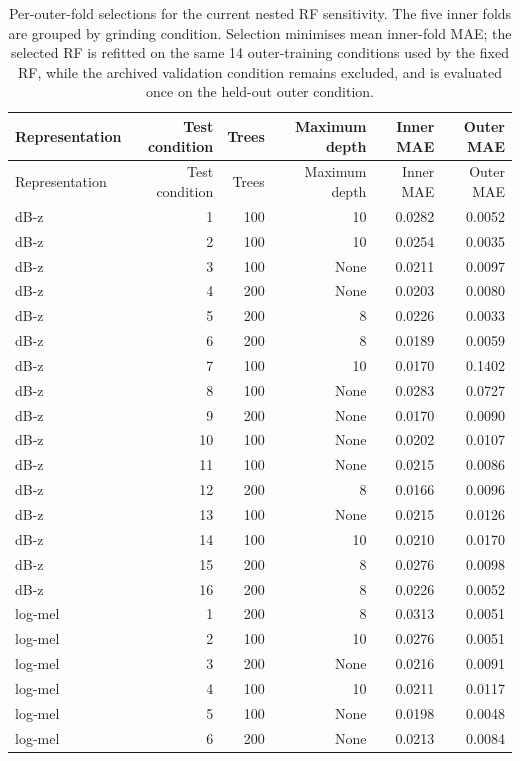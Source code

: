 \begin{longtable}{@{}lrrrrr@{}}
\caption{Per-outer-fold selections for the current nested RF sensitivity.
The five inner folds are grouped by grinding condition. Selection minimises
mean inner-fold MAE; the selected RF is refitted on the same 14 outer-training
conditions used by the fixed RF, while the archived validation condition
remains excluded, and is evaluated once on the held-out outer condition.}
\label{tab:supp-nested-rf-selections}\\
\toprule
Representation & Test condition & Trees & Maximum depth & Inner MAE & Outer MAE \\
\midrule
\endfirsthead
\toprule
Representation & Test condition & Trees & Maximum depth & Inner MAE & Outer MAE \\
\midrule
\endhead
dB-z & 1 & 100 & 10 & 0.0282 & 0.0052 \\
dB-z & 2 & 100 & 10 & 0.0254 & 0.0035 \\
dB-z & 3 & 100 & None & 0.0211 & 0.0097 \\
dB-z & 4 & 200 & None & 0.0203 & 0.0080 \\
dB-z & 5 & 200 & 8 & 0.0226 & 0.0033 \\
dB-z & 6 & 200 & 8 & 0.0189 & 0.0059 \\
dB-z & 7 & 100 & 10 & 0.0170 & 0.1402 \\
dB-z & 8 & 100 & None & 0.0283 & 0.0727 \\
dB-z & 9 & 200 & None & 0.0170 & 0.0090 \\
dB-z & 10 & 100 & None & 0.0202 & 0.0107 \\
dB-z & 11 & 100 & None & 0.0215 & 0.0086 \\
dB-z & 12 & 200 & 8 & 0.0166 & 0.0096 \\
dB-z & 13 & 100 & None & 0.0215 & 0.0126 \\
dB-z & 14 & 100 & 10 & 0.0210 & 0.0170 \\
dB-z & 15 & 200 & 8 & 0.0276 & 0.0098 \\
dB-z & 16 & 200 & 8 & 0.0226 & 0.0052 \\
log-mel & 1 & 200 & 8 & 0.0313 & 0.0051 \\
log-mel & 2 & 100 & 10 & 0.0276 & 0.0051 \\
log-mel & 3 & 200 & None & 0.0216 & 0.0091 \\
log-mel & 4 & 100 & 10 & 0.0211 & 0.0117 \\
log-mel & 5 & 100 & None & 0.0198 & 0.0048 \\
log-mel & 6 & 200 & None & 0.0213 & 0.0084 \\

\end{longtable}
